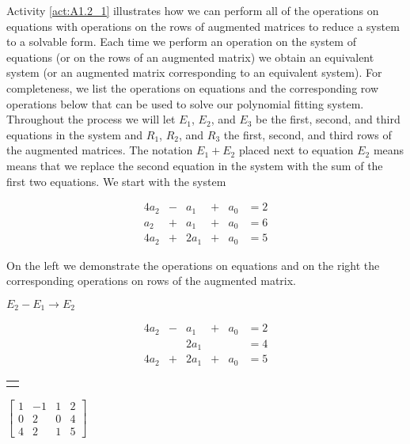 Activity \ref{act:A1.2_1} illustrates how we can perform all of the operations on equations with operations on the rows of augmented matrices to reduce a system to a solvable form. Each time we perform an operation on the system of equations (or on the rows of an augmented matrix) we obtain an equivalent system (or an augmented matrix corresponding to an equivalent system). For completeness, we list the operations on equations and the corresponding row operations below that can be used to solve our polynomial fitting system. Throughout the process we will let $E_1$, $E_2$, and $E_3$ be the first, second, and third equations in the system and $R_1$, $R_2$, and $R_3$ the first, second, and third rows of the augmented matrices. The notation $E_1+E_2$ placed next to equation $E_2$ means means that we replace the second equation in the system with the sum of the first two equations. We start with the system

\begin{alignat*}{4}
{}a_2	&{}-{} 	&{}a_1 	&{}+{}	&{}a_0 	&= 2   \\
{}a_2 	&{}+{}	&{}a_1 	&{}+{}	&{}a_0  &= 6   \\
4a_2 		&{}+{} 	&2a_1 	&{}+{} 	&{}a_0 	&= 5
\end{alignat*} 



On the left we demonstrate the operations on equations and on the right the corresponding operations on rows of the augmented matrix.


\hspace{-0.2in}
\begin{minipage}{0.7in}
\vspace{0.2in}
{\tiny $E_2-E_1\to E_2$}
\end{minipage}
\hspace{-0.1in}
\begin{minipage}{1.8in}
\vspace{-0.1in}
\begin{alignat*}{4}
{}a_2	&{}-{} 	&{}a_1 	&{}+{}	&{}a_0 	&{}= 2   \\
{}	 	&{}		&2a_1 	&{}		&{}	 	&{}= 4   \\
4a_2 	&{}+{} 	&2a_1 	&{}+{} 	&{}a_0 	&{}= 5
\end{alignat*} 
\end{minipage}
\begin{minipage}{2.35in}
\begin{center}
\renewcommand{\arraystretch}{1.2}
\begin{tabular}{r} \\ \vspace{0.15in}{\tiny $R_2-R_1\to R_2$} \\ \end{tabular} \hspace{-0.1in}$\left[ \begin{array}{rrr|r} 1 &-1 &1 &2 \\ 0 &2 &0 &4 \\ 4 &2&1 &5 \end{array} \right]$
\end{center}
\end{minipage}

